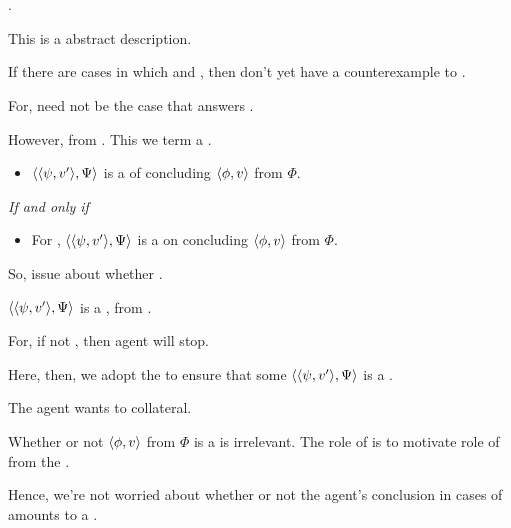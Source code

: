 \newpage


\section{}

\begin{note}
  \sCe{}.

  This is a abstract description.

  If there are cases in which \curb{} and \sCe{}, then don't yet have a counterexample to \issueConstraint{}.

  For, need not be the case that \ros{} answers \qWhy{}.

  However, \curb{} from \agpe{}.
  This we term a \requ{}.

  \begin{definition}[\requ{2}]
    \label{def:requ}
    \begin{itemize}
    \item
      \(\langle \langle \psi, v' \rangle, \Psi \rangle\) is a \requ{} of concluding \(\langle \phi, v \rangle\) from \(\Phi\).
    \end{itemize}

    \emph{If and only if}

    \begin{itemize}
    \item
      For , \(\langle \langle \psi, v' \rangle, \Psi \rangle\) is a \curb{} on concluding \(\langle \phi, v \rangle\) from \(\Phi\).
    \end{itemize}
  \end{definition}


  So, issue about whether \sCon{}.

  \begin{definition}[\cScen{}]
    \(\langle \langle \psi, v' \rangle, \Psi \rangle\) is a \curb{}, from \agpe{}.

    For, if not \fc{}, then agent will stop.
  \end{definition}

  Here, then, we adopt the \agpe{} to ensure that some \(\langle \langle \psi, v' \rangle, \Psi \rangle\) is a \curb{}.

  The agent wants to collateral.

  Whether or not \(\langle \phi, v \rangle\) from \(\Phi\) is a \sCon{} is irrelevant.
  The role of \sCe{} is to motivate role of \curb{} from the \agpe{}.
\end{note}

\begin{note}
  Hence, we're not worried about whether or not the agent's conclusion in cases of  amounts to a \sCon{}.
\end{note}

